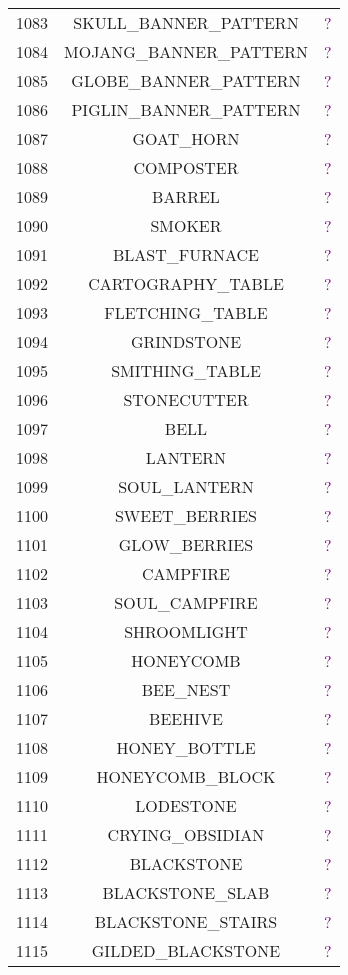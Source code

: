 \documentclass[11pt]{article}
\newcommand\myworries[1]{\textcolor{purple}{#1}}
\begin{document}
\begin{longtable}{ |c|c|c| }
	1083 & SKULL\_BANNER\_PATTERN & \myworries{?} \\
	1084 & MOJANG\_BANNER\_PATTERN & \myworries{?} \\
	1085 & GLOBE\_BANNER\_PATTERN & \myworries{?} \\
	1086 & PIGLIN\_BANNER\_PATTERN & \myworries{?} \\
	1087 & GOAT\_HORN & \myworries{?} \\
	1088 & COMPOSTER & \myworries{?} \\
	1089 & BARREL & \myworries{?} \\
	1090 & SMOKER & \myworries{?} \\
	1091 & BLAST\_FURNACE & \myworries{?} \\
	1092 & CARTOGRAPHY\_TABLE & \myworries{?} \\
	1093 & FLETCHING\_TABLE & \myworries{?} \\
	1094 & GRINDSTONE & \myworries{?} \\
	1095 & SMITHING\_TABLE & \myworries{?} \\
	1096 & STONECUTTER & \myworries{?} \\
	1097 & BELL & \myworries{?} \\
	1098 & LANTERN & \myworries{?} \\
	1099 & SOUL\_LANTERN & \myworries{?} \\
	1100 & SWEET\_BERRIES & \myworries{?} \\
	1101 & GLOW\_BERRIES & \myworries{?} \\
	1102 & CAMPFIRE & \myworries{?} \\
	1103 & SOUL\_CAMPFIRE & \myworries{?} \\
	1104 & SHROOMLIGHT & \myworries{?} \\
	1105 & HONEYCOMB & \myworries{?} \\
	1106 & BEE\_NEST & \myworries{?} \\
	1107 & BEEHIVE & \myworries{?} \\
	1108 & HONEY\_BOTTLE & \myworries{?} \\
	1109 & HONEYCOMB\_BLOCK & \myworries{?} \\
	1110 & LODESTONE & \myworries{?} \\
	1111 & CRYING\_OBSIDIAN & \myworries{?} \\
	1112 & BLACKSTONE & \myworries{?} \\
	1113 & BLACKSTONE\_SLAB & \myworries{?} \\
	1114 & BLACKSTONE\_STAIRS & \myworries{?} \\
	1115 & GILDED\_BLACKSTONE & \myworries{?} \\

\end{longtable}
\end{document}
